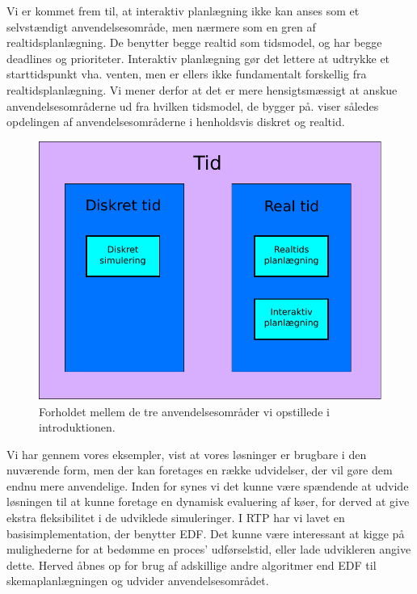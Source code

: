 Vi er kommet frem til, at interaktiv planlægning ikke kan anses som et selvstændigt anvendelsesområde, men nærmere som en gren af realtidsplanlægning. De benytter begge realtid som tidsmodel, og har begge deadlines og prioriteter. Interaktiv planlægning gør det lettere at udtrykke et starttidspunkt vha. venten, men er ellers ikke fundamentalt forskellig fra realtidsplanlægning. Vi mener derfor at det er mere hensigtsmæssigt at anskue anvendelsesområderne ud fra hvilken tidsmodel, de bygger på.  viser således opdelingen af anvendelsesområderne i henholdsvis diskret og realtid.

\begin{figure}[htp]
 \begin{center}
  \includegraphics[scale=0.6]{images/timemodel}
	\caption{Forholdet mellem de tre anvendelsesområder vi opstillede i introduktionen.}
	\label{fig:timemodel}
\end{center}
\end{figure}


Vi har gennem vores eksempler, vist at vores løsninger er brugbare i den nuværende form, men der kan foretages en række udvidelser, der vil gøre dem endnu mere anvendelige. 
Inden for \des synes vi det kunne være spændende at udvide løsningen til at kunne foretage en dynamisk evaluering af køer, for derved at give ekstra fleksibilitet i de udviklede simuleringer. I RTP har vi lavet en basisimplementation, der benytter EDF. Det kunne være interessant at kigge på mulighederne for at bedømme en proces' udførselstid, eller lade udvikleren angive dette. Herved åbnes op for brug af adskillige andre algoritmer end EDF til skemaplanlægningen og udvider anvendelsesområdet.  







